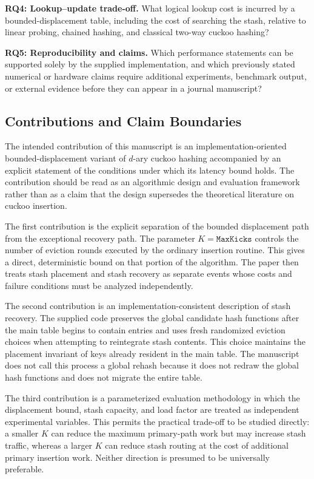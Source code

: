 \documentclass[conference]{IEEEtran}
\begin{document}
\textbf{RQ4: Lookup--update trade-off.} What logical lookup cost is incurred by a bounded-displacement table, including the cost of searching the stash, relative to linear probing, chained hashing, and classical two-way cuckoo hashing?

\textbf{RQ5: Reproducibility and claims.} Which performance statements can be supported solely by the supplied implementation, and which previously stated numerical or hardware claims require additional experiments, benchmark output, or external evidence before they can appear in a journal manuscript?

\subsection{Contributions and Claim Boundaries}

The intended contribution of this manuscript is an implementation-oriented bounded-displacement variant of $d$-ary cuckoo hashing accompanied by an explicit statement of the conditions under which its latency bound holds. The contribution should be read as an algorithmic design and evaluation framework rather than as a claim that the design supersedes the theoretical literature on cuckoo insertion.

The first contribution is the explicit separation of the bounded displacement path from the exceptional recovery path. The parameter $K=\mathtt{MaxKicks}$ controls the number of eviction rounds executed by the ordinary insertion routine. This gives a direct, deterministic bound on that portion of the algorithm. The paper then treats stash placement and stash recovery as separate events whose costs and failure conditions must be analyzed independently.

The second contribution is an implementation-consistent description of stash recovery. The supplied code preserves the global candidate hash functions after the main table begins to contain entries and uses fresh randomized eviction choices when attempting to reintegrate stash contents. This choice maintains the placement invariant of keys already resident in the main table. The manuscript does not call this process a global rehash because it does not redraw the global hash functions and does not migrate the entire table.

The third contribution is a parameterized evaluation methodology in which the displacement bound, stash capacity, and load factor are treated as independent experimental variables. This permits the practical trade-off to be studied directly: a smaller $K$ can reduce the maximum primary-path work but may increase stash traffic, whereas a larger $K$ can reduce stash routing at the cost of additional primary insertion work. Neither direction is presumed to be universally preferable.
\end{document}
